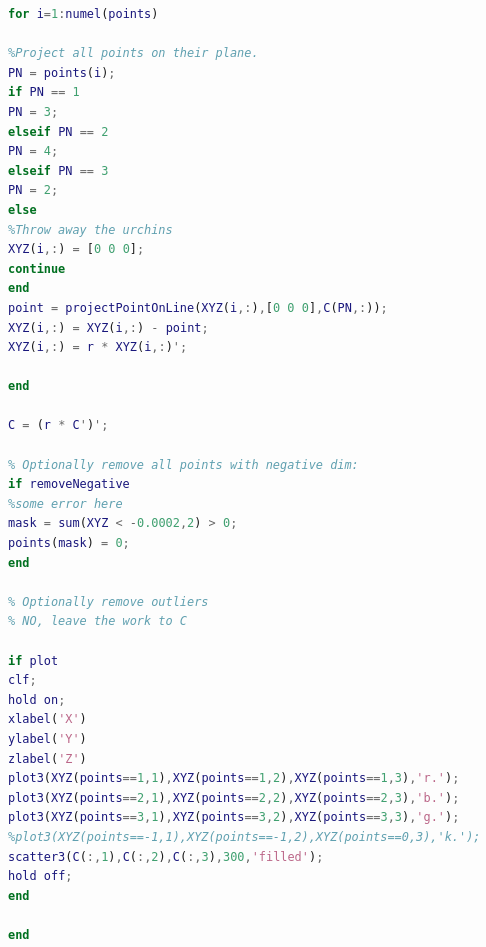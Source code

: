 \documentclass[10pt,a4paper]{article}
\begin{document}
\begin{lstlisting}[language=matlab]
for i=1:numel(points)

%Project all points on their plane.
PN = points(i);
if PN == 1
PN = 3;
elseif PN == 2
PN = 4;
elseif PN == 3
PN = 2;
else
%Throw away the urchins
XYZ(i,:) = [0 0 0];
continue
end
point = projectPointOnLine(XYZ(i,:),[0 0 0],C(PN,:));
XYZ(i,:) = XYZ(i,:) - point;
XYZ(i,:) = r * XYZ(i,:)';

end

C = (r * C')';

% Optionally remove all points with negative dim:
if removeNegative
%some error here
mask = sum(XYZ < -0.0002,2) > 0;
points(mask) = 0;
end

% Optionally remove outliers 
% NO, leave the work to C

if plot
clf;
hold on;
xlabel('X')
ylabel('Y')
zlabel('Z')
plot3(XYZ(points==1,1),XYZ(points==1,2),XYZ(points==1,3),'r.');
plot3(XYZ(points==2,1),XYZ(points==2,2),XYZ(points==2,3),'b.');
plot3(XYZ(points==3,1),XYZ(points==3,2),XYZ(points==3,3),'g.');
%plot3(XYZ(points==-1,1),XYZ(points==-1,2),XYZ(points==0,3),'k.');
scatter3(C(:,1),C(:,2),C(:,3),300,'filled');
hold off;
end

end

\end{lstlisting}
\end{document}
